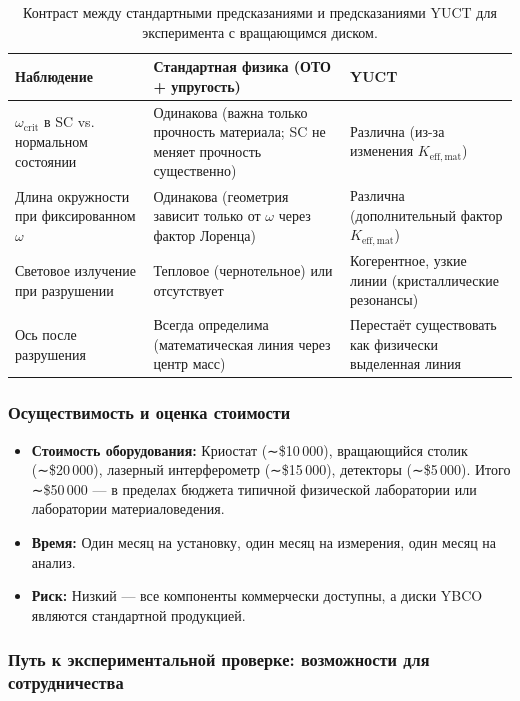 \documentclass[12pt,a4paper]{article}
\begin{document}
	\begin{table}[h]
		\centering
		\caption{Контраст между стандартными предсказаниями и предсказаниями YUCT для эксперимента с вращающимся диском.}
		\label{tab:experiment_predictions}
		\begin{tabular}{p{5cm}p{4cm}p{4cm}}
			\toprule
			\textbf{Наблюдение} & \textbf{Стандартная физика (ОТО + упругость)} & \textbf{YUCT} \\
			\midrule
			\(\omega_{\text{crit}}\) в SC vs. нормальном состоянии & Одинакова (важна только прочность материала; SC не меняет прочность существенно) & Различна (из-за изменения \(K_{\mathrm{eff,mat}}\)) \\
			Длина окружности при фиксированном \(\omega\) & Одинакова (геометрия зависит только от \(\omega\) через фактор Лоренца) & Различна (дополнительный фактор \(K_{\mathrm{eff,mat}}\)) \\
			Световое излучение при разрушении & Тепловое (чернотельное) или отсутствует & Когерентное, узкие линии (кристаллические резонансы) \\
			Ось после разрушения & Всегда определима (математическая линия через центр масс) & Перестаёт существовать как физически выделенная линия \\
			\bottomrule
		\end{tabular}
	\end{table}
	
	\subsubsection{Осуществимость и оценка стоимости}
	
	\begin{itemize}
		\item \textbf{Стоимость оборудования:} Криостат (∼\$10 000), вращающийся столик (∼\$20 000), лазерный интерферометр (∼\$15 000), детекторы (∼\$5 000). Итого ∼\$50 000 — в пределах бюджета типичной физической лаборатории или лаборатории материаловедения.
		\item \textbf{Время:} Один месяц на установку, один месяц на измерения, один месяц на анализ.
		\item \textbf{Риск:} Низкий — все компоненты коммерчески доступны, а диски YBCO являются стандартной продукцией.
	\end{itemize}
	
	\subsubsection{Путь к экспериментальной проверке: возможности для сотрудничества}
	
\end{document}
